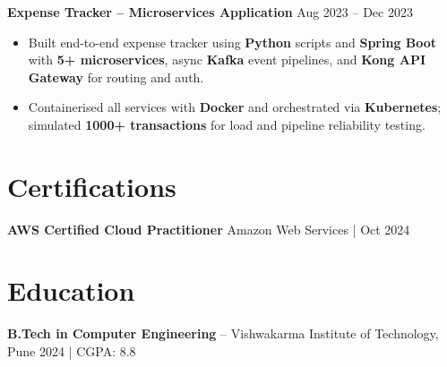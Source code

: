 \documentclass[a4paper,10pt]{article}
\begin{document}
\textbf{Expense Tracker -- Microservices Application} \hfill Aug 2023 -- Dec 2023
\begin{itemize}[leftmargin=*]
    \item Built end-to-end expense tracker using \textbf{Python} scripts and \textbf{Spring Boot} with \textbf{5+ microservices}, async \textbf{Kafka} event pipelines, and \textbf{Kong API Gateway} for routing and auth.
    \item Containerised all services with \textbf{Docker} and orchestrated via \textbf{Kubernetes}; simulated \textbf{1000+ transactions} for load and pipeline reliability testing.
\end{itemize}

\section*{Certifications}
\textbf{AWS Certified Cloud Practitioner} \hfill Amazon Web Services \;|\; Oct 2024

\section*{Education}
\textbf{B.Tech in Computer Engineering} -- Vishwakarma Institute of Technology, Pune \hfill 2024 \;|\; CGPA: 8.8
\end{document}
